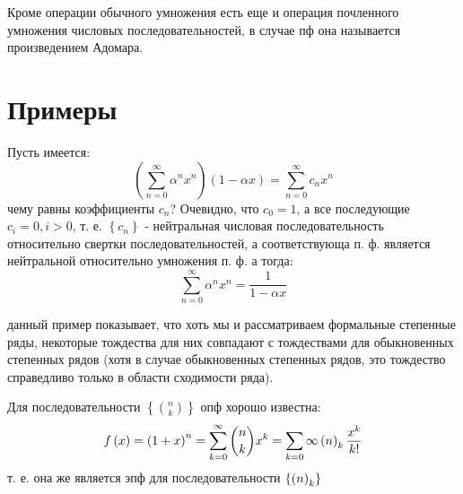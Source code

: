 Кроме операции обычного умножения есть еще и операция почленного умножения числовых последовательностей, в случае пф она называется произведением Адомара.

\section{Примеры}

Пусть имеется: $$ \left(\sum_{n=0}^{\infty} \alpha^nx^n\right)\left(1-\alpha x\right) = \sum_{n=0}^{\infty} c_n x^n $$ чему равны коэффициенты $c_n$? Очевидно, что $c_0 = 1$, а все последующие $c_i = 0, i>0$, т. е. $\left\{c_n\right\}$ - нейтральная числовая последовательность относительно свертки последовательностей, а соответствующа п. ф. является нейтральной относительно умножения п. ф. а тогда:
\begin{equation}
	\sum_{n=0}^{\infty} \alpha^n x^n = \frac{1}{1 - \alpha x}
\end{equation}

данный пример показывает, что хоть мы и рассматриваем формальные степенные ряды, некоторые тождества для них совпадают с тождествами для обыкновенных степенных рядов (хотя в случае обыкновенных степенных рядов, это тождество справедливо только в области сходимости ряда).

Для последовательности $\left\{\binom{n}{k}\right\}$ опф хорошо известна:
\begin{equation}
	f\left(x\right) = \left(1+x\right)^n = \sum_{k=0}^{\infty} \binom{n}{k}x^k = \sum_{k=0}{\infty} \left({n}\right)_{k} \frac{x^k}{k!}
\end{equation}
т. е. она же является эпф для последовательности $\left\{\left({n}\right)_{k}\right\}$
